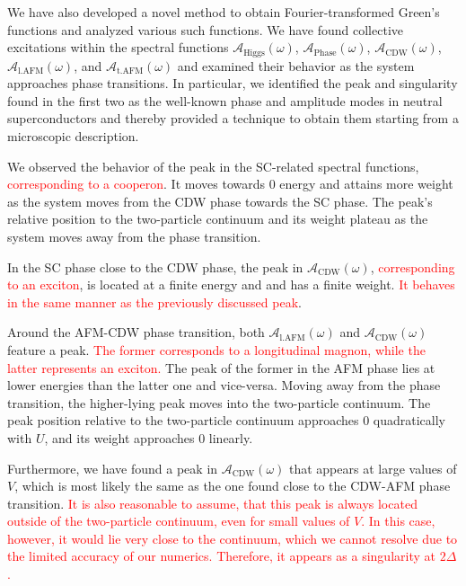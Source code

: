 \documentclass[
    reprint, 
    aps,
    preprintnumbers,
    twocolumn,
    prb,
    superscriptaddress
]{revtex4-2}
\newcommand{\spectral}[1]{\mathcal{A}_\text{#1}  (\omega)}
\newcommand{\markEdited}{red}
\begin{document}
We have also developed a novel method to obtain Fourier-transformed Green's functions and analyzed various such functions. 
We have found collective excitations within the spectral functions $\spectral{Higgs}$, $\spectral{Phase}$, $\spectral{CDW}$, $\spectral{l.AFM}$, and $\spectral{t.AFM}$ 
and examined their behavior as the system approaches phase transitions. 
In particular, we identified the peak and singularity found in the first two as the well-known phase and amplitude modes in neutral superconductors 
and thereby provided a technique to obtain them starting from a microscopic description.

We observed the behavior of the peak in the SC-related spectral functions, \textcolor{\markEdited}{corresponding to a cooperon}.
It moves towards 0 energy and attains more weight as the system moves from the CDW phase towards the SC phase. 
The peak's relative position to the two-particle continuum and its weight plateau as the system moves away from the phase transition.

In the SC phase close to the CDW phase, the peak in $\spectral{CDW}$, \textcolor{\markEdited}{corresponding to an exciton}, is located at a finite energy and and has a finite weight. 
\textcolor{\markEdited}{It behaves in the same manner as the previously discussed peak}.

Around the AFM-CDW phase transition, both $\spectral{l.AFM}$ and $\spectral{CDW}$ feature a peak. 
\textcolor{\markEdited}{The former corresponds to a longitudinal magnon, while the latter represents an exciton.}
The peak of the former in the AFM phase lies at lower energies than the latter one and vice-versa. 
Moving away from the phase transition, the higher-lying peak moves into the two-particle continuum. 
The peak position relative to the two-particle continuum approaches $0$ quadratically with $U$, and its weight approaches $0$ linearly.

Furthermore, we have found a peak in $\spectral{CDW}$ that appears at large values of $V$, 
which is most likely the same as the one found close to the CDW-AFM phase transition. 
\textcolor{\markEdited}{It is also reasonable to assume, that this peak is always located outside of the two-particle continuum, even for small values of $V$.
In this case, however, it would lie very close to the continuum, which we cannot resolve due to the limited accuracy of our numerics.
Therefore, it appears as a singularity at $2\Delta$.}

\end{document}
